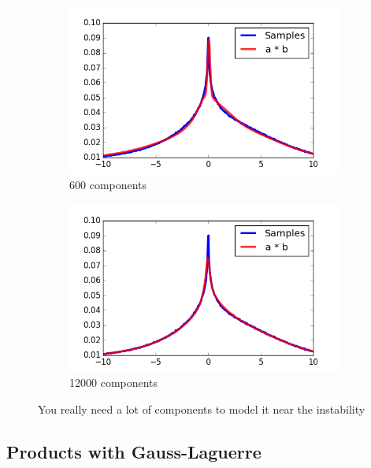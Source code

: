 \documentclass[11pt,a4paper]{book}
\begin{document}
\begin{figure}[h]
  \centering
  \begin{subfigure}[t]{0.45\textwidth}
    \centering
    \includegraphics[width=\textwidth]{thesis/operations/product-hermite-100-components}
    \caption{600 components}
  \end{subfigure}
  \hfill
  \begin{subfigure}[t]{0.45\textwidth}
    \centering
    \includegraphics[width=\textwidth]{thesis/operations/product-hermite-2000-components}
    \caption{12000 components}
  \end{subfigure}
  \caption{You really need a lot of components to model it near the instability}
  \label{fig:product-hermite-2}
\end{figure}

\subsection{Products with Gauss-Laguerre}
\end{document}
